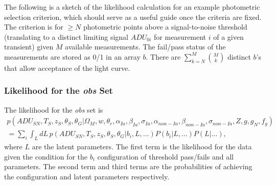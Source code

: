 \documentclass[preprint,3p]{elsarticle}
\begin{document}



The following is a sketch of the likelihood calculation for an example 
photometric selection criterion, which should serve as a useful guide once the criteria are fixed.
The criterion is for $\ge N$ photometric points
above a signal-to-noise threshold (translating to a distinct limiting signal $ADU_{0i}$
for measurement $i$ of a given transient) given $M$ available measurements. 
The fail/pass status of the measurements are stored as 0/1 in an array $b$.
There are $\sum_{k=N}^M \binom{M}{k}$ 
distinct $b$'s that allow acceptance of the light curve.




\subsubsection{Likelihood for the {\it obs} Set}
The likelihood for the {\it obs} set is
\begin{multline}
p(\mathit{ADU}_{SN}, {{T}}_S,{{z}}_S, \theta_{S}, \theta_G |  \Omega_M, w, \theta_r, \alpha_{Ia}, \beta_{Ia},\sigma_{Ia}, \alpha_{\mathit{non-Ia}},\beta_{\mathit{non-Ia}}, \sigma_{\mathit{non-Ia}},  Z, g, g_N, f_g)\\
= \sum_i \int_L dL\, p(\mathit{ADU}_{SN}, {{T}}_S,{{z}}_S, \theta_{S}, \theta_G | b_i, L, \ldots)
P(b_{i} |L, \ldots) P(L|\ldots) ,
\end{multline} 
where $L$ are the latent parameters.
The first term is the likelihood for the data given the condition for the  $b_i$ configuration
of threshold pass/fails  and all parameters.  The second term and
third terms are the probabilities of achieving the configuration
and latent parameters
respectively.
\end{document}
